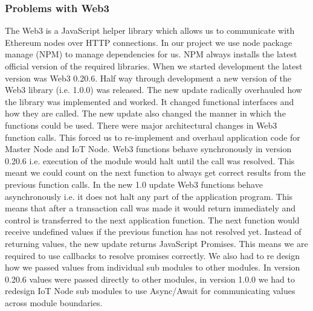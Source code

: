 \subsubsection{Problems with Web3}
The Web3 is a JavaScript helper library which allows us to communicate with Ethereum nodes over HTTP connections. In our project we use node package manage (NPM) to manage dependencies for us. NPM always installs the latest official version of the required libraries. When we started development the latest version was Web3 0.20.6. Half way through development a new version of the Web3 library (i.e. 1.0.0) was released. The new update radically overhauled how the library was implemented and worked. It changed functional interfaces and how they are called. The new update also changed the manner in which the functions could be used. There were major architectural changes in Web3 function calls. This forced us to re-implement and overhaul application code for Master Node and IoT Node. Web3 functions behave synchronously in version 0.20.6 i.e. execution of the module would halt until the call was resolved. This meant we could count on the next function to always get correct results from the previous function calls. In the new 1.0 update Web3 functions behave asynchronously i.e. it does not halt any part of the application program. This means that after a transaction call was made it would return immediately and control is transferred to the next application function. The next function would receive undefined values if the previous function has not resolved yet. Instead of returning values, the new update returns JavaScript Promises. This means we are required to use callbacks to resolve promises correctly. We also had to re design how we passed values from individual sub modules to other modules. In version 0.20.6 values were passed directly to other modules, in version 1.0.0 we had to redesign IoT Node sub modules to use Async/Await for communicating values across module boundaries.  

